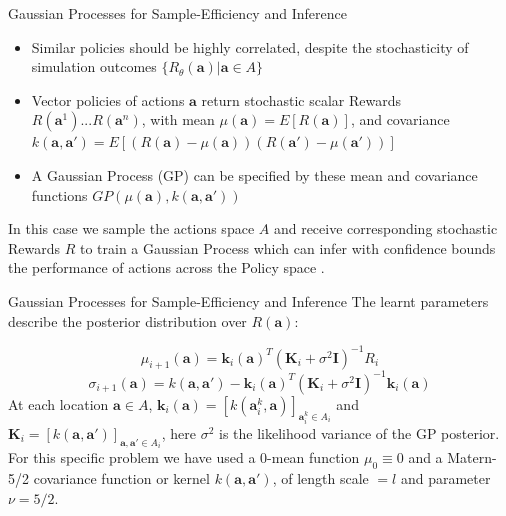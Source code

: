 \documentclass[10pt,usenames,dvipsnames]{beamer}
\begin{document}
\begin{frame}{Gaussian Processes for Sample-Efficiency and Inference}

\begin{itemize}
\item Similar policies should be highly correlated, despite the stochasticity of simulation outcomes  $\{R_\theta(\bm{a})| \bm{a}\in A \}$
\item Vector policies of actions $\bm{a}$ return stochastic scalar Rewards $R(\bm{a}^{1})...R(\bm{a}^{n})$, with mean $\mu(\bm{a}) = E[R(\bm{a})] $, and covariance $ k(\bm{a},\bm{a}')=E[(R(\bm{a})-\mu(\bm{a}))(R(\bm{a}')-\mu(\bm{a}'))]$
\item A Gaussian Process (GP) can be specified by these mean and covariance functions $GP(\mu(\bm{a}),k(\bm{a},\bm{a}'))$


\end{itemize}

In this case we sample the actions space $A$ and receive corresponding stochastic Rewards $R$ to train a Gaussian Process which can infer with confidence bounds the performance of actions across the Policy space \cite{Williams1996}.  



\end{frame}

\begin{frame}{Gaussian Processes for Sample-Efficiency and Inference}
The learnt parameters describe the posterior distribution over $R(\bm{a})$:

\begin{equation}
\mu_{i+1}(\bm{a}) = \bm{k}_i(\bm{a})^{T}(\bm{K}_{i}+\sigma^2\bm{I})^{-1}R_i
\end{equation}
\begin{equation}
\sigma_{i+1}(\bm{a}) = k(\bm{a},\bm{a}') - \bm{k}_i(\bm{a})^{T}(\bm{K}_{i}+\sigma^2\bm{I})^{-1}\bm{k}_i(\bm{a})
\end{equation}
At each location $\bm{a} \in A$,  $\bm{k}_i(\bm{a})=[k(\bm{a}_i^k,\bm{a})]_{\bm{a}_i^k\in A_i}$ and $\bm{K}_i = [k(\bm{a},\bm{a}')]_{\bm{a},\bm{a}'\in A_i}$, here $\sigma^2$ is the likelihood variance of the GP posterior. For this specific problem we have used a 0-mean function $\mu_0 \equiv 0$ and a Matern-5/2 covariance function or kernel $k(\bm{a},\bm{a}')$, of length scale $=l$ and parameter $\nu = 5/2$.


\end{frame}
\end{document}
